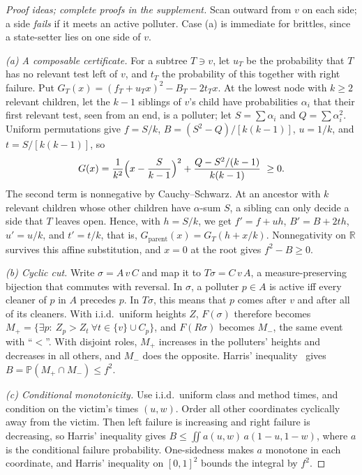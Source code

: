 \documentclass[conference,letterpaper]{IEEEtran}
\theoremstyle{definition}
\newcommand{\Prb}{\mathbb{P}}
\begin{document}
\begin{proof}[Proof ideas; complete proofs in the supplement]
Scan outward from $v$ on each side; a side \emph{fails} if it meets an active polluter. Case (a) is immediate for brittles, since a state-setter lies on one side of $v$.

\emph{(a) A composable certificate.} For a subtree $T\ni v$, let $u_T$ be the probability that $T$ has no relevant test left of $v$, and $t_T$ the probability of this together with right failure. Put $G_T(x)=(f_T+u_Tx)^2-B_T-2t_Tx$. At the lowest node with $k\ge2$ relevant children, let the $k-1$ siblings of $v$'s child have probabilities $\alpha_i$ that their first relevant test, seen from an end, is a polluter; let $S=\sum\alpha_i$ and $Q=\sum\alpha_i^2$. Uniform permutations give $f=S/k$, $B=(S^2-Q)/[k(k-1)]$, $u=1/k$, and $t=S/[k(k-1)]$, so
\[
G(x)=\frac{1}{k^2}\Bigl(x-\frac{S}{k-1}\Bigr)^{2}+\frac{Q-S^2/(k-1)}{k(k-1)}\ \ge0 .
\]
The second term is nonnegative by Cauchy--Schwarz. At an ancestor with $k$ relevant children whose other children have $\alpha$-sum $S$, a sibling can only decide a side that $T$ leaves open. Hence, with $h=S/k$, we get $f'=f+uh$, $B'=B+2th$, $u'=u/k$, and $t'=t/k$, that is, $G_{\text{parent}}(x)=G_T(h+x/k)$. Nonnegativity on $\mathbb R$ survives this affine substitution, and $x=0$ at the root gives $f^2-B\ge0$.

\emph{(b) Cyclic cut.} Write $\sigma=A\,v\,C$ and map it to $T\sigma=C\,v\,A$, a measure-preserving bijection that commutes with reversal. In $\sigma$, a polluter $p\in A$ is active iff every cleaner of $p$ in $A$ precedes $p$. In $T\sigma$, this means that $p$ comes after $v$ and after all of its cleaners. With i.i.d.\ uniform heights $Z$, $F(\sigma)$ therefore becomes $M_+=\{\exists p:\ Z_p>Z_t\ \forall t\in\{v\}\cup C_p\}$, and $F(R\sigma)$ becomes $M_-$, the same event with ``$<$''. With disjoint roles, $M_+$ increases in the polluters' heights and decreases in all others, and $M_-$ does the opposite. Harris' inequality~\cite{harris1960} gives $B=\Prb(M_+\cap M_-)\le f^2$.

\emph{(c) Conditional monotonicity.} Use i.i.d.\ uniform class and method times, and condition on the victim's times $(u,w)$. Order all other coordinates cyclically away from the victim. Then left failure is increasing and right failure is decreasing, so Harris' inequality gives $B\le\iint a(u,w)\,a(1-u,1-w)$, where $a$ is the conditional failure probability. One-sidedness makes $a$ monotone in each coordinate, and Harris' inequality on $[0,1]^2$ bounds the integral by $f^2$.


\end{proof}
\end{document}
